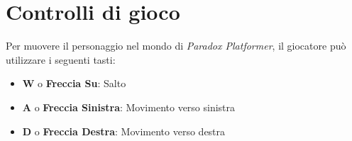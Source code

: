 \documentclass[a4paper,12pt]{report}
\begin{document}
	\section{Controlli di gioco}
	
	Per muovere il personaggio nel mondo di \textit{Paradox Platformer}, il giocatore può utilizzare i seguenti tasti:
	
	\begin{itemize}
		\item \textbf{W} o \textbf{Freccia Su}: Salto
		\item \textbf{A} o \textbf{Freccia Sinistra}: Movimento verso sinistra
		\item \textbf{D} o \textbf{Freccia Destra}: Movimento verso destra
	\end{itemize}
	
	
	
	
\end{document}
